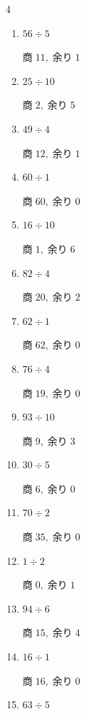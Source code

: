 \begin{multicols}{4}
\begin{enumerate}
\columnbreak %

\resetques

  \item $56 \div 5$

        $商\; 11,\; 余り\; 1$

  \item $25 \div 10$

        $商\; 2,\; 余り\; 5$

  \item $49 \div 4$

        $商\; 12,\; 余り\; 1$

  \item $60 \div 1$

        $商\; 60,\; 余り\; 0$

  \item $16 \div 10$

        $商\; 1,\; 余り\; 6$

  \item $82 \div 4$

        $商\; 20,\; 余り\; 2$

  \item $62 \div 1$

        $商\; 62,\; 余り\; 0$

  \item $76 \div 4$

        $商\; 19,\; 余り\; 0$

  \item $93 \div 10$

        $商\; 9,\; 余り\; 3$

  \item $30 \div 5$

        $商\; 6,\; 余り\; 0$

  \item $70 \div 2$

        $商\; 35,\; 余り\; 0$

  \item $1 \div 2$

        $商\; 0,\; 余り\; 1$

  \item $94 \div 6$

        $商\; 15,\; 余り\; 4$

  \item $16 \div 1$

        $商\; 16,\; 余り\; 0$

  \item $63 \div 5$


\end{enumerate}
\end{multicols}
